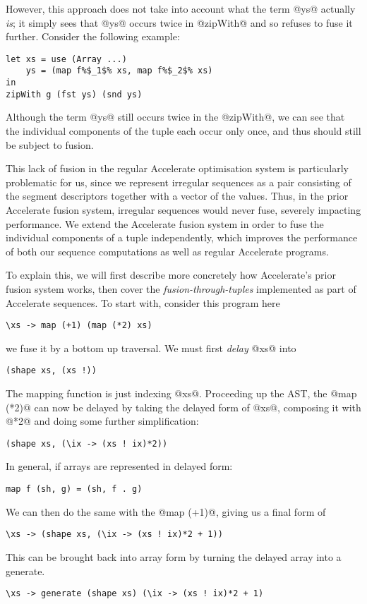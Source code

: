 However, this approach does not take into account what the term @ys@ actually
\emph{is}; it simply sees that @ys@ occurs twice in @zipWith@ and so refuses to
fuse it further. Consider the following example:
%
\begin{lstlisting}
let xs = use (Array ...)
    ys = (map f%$_1$% xs, map f%$_2$% xs)
in
zipWith g (fst ys) (snd ys)
\end{lstlisting}
%
Although the term @ys@ still occurs twice in the @zipWith@, we can see that the
individual components of the tuple each occur only once, and thus should still
be subject to fusion.

This lack of fusion in the regular Accelerate optimisation system is
particularly problematic for us, since we represent irregular sequences as a
pair consisting of the segment descriptors together with a vector of the values. Thus, in the prior Accelerate fusion system, irregular sequences would never fuse, severely impacting performance. We extend the Accelerate fusion system in order to fuse the individual components of a tuple independently, which improves the performance of both our sequence computations as well as regular Accelerate programs.

To explain this, we will first describe more concretely how Accelerate's prior fusion system works, then cover the \emph{fusion-through-tuples} implemented as part of Accelerate sequences. To start with, consider this program here
%
\begin{lstlisting}
\xs -> map (+1) (map (*2) xs)
\end{lstlisting}
%
we fuse it by a bottom up traversal. We must first \emph{delay} @xs@ into
%
\begin{lstlisting}
(shape xs, (xs !))
\end{lstlisting}
%
The mapping function is just indexing @xs@. Proceeding up the AST, the @map (*2)@ can now be delayed by taking the delayed form of @xs@, composing it with @*2@ and doing some further simplification:
%
\begin{lstlisting}
(shape xs, (\ix -> (xs ! ix)*2))
\end{lstlisting}
%
In general, if arrays are represented in delayed form:
%
\begin{lstlisting}
map f (sh, g) = (sh, f . g)
\end{lstlisting}
%
We can then do the same with the @map (+1)@, giving us a final form of
%
\begin{lstlisting}
\xs -> (shape xs, (\ix -> (xs ! ix)*2 + 1))
\end{lstlisting}
%
This can be brought back into array form by turning the delayed array into a generate.
%
\begin{lstlisting}
\xs -> generate (shape xs) (\ix -> (xs ! ix)*2 + 1)
\end{lstlisting}
%

